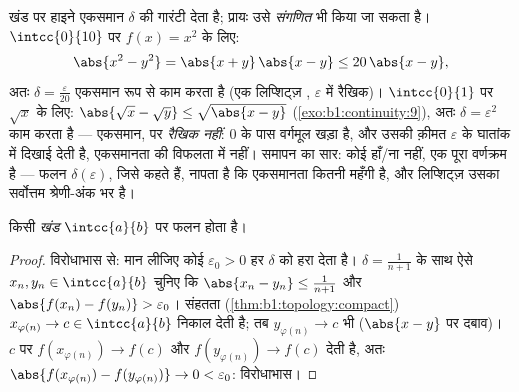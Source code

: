 \begin{example}[एकसमान मापांक, स्पष्ट रूप से]\label{ex:b1:continuity:moduli}
खंड पर हाइने एकसमान $\delta$ की गारंटी देता है; प्रायः उसे \emph{संगणित} भी
किया जा सकता है। $\intcc{0}{10}$ पर $f(x) = x^2$ के लिए:
\[
\abs{x^2 - y^2} = \abs{x + y}\,\abs{x - y} \leq 20\,\abs{x - y},
\]
अतः $\delta = \frac{\varepsilon}{20}$ एकसमान रूप से काम करता है (एक
लिप्शिट्ज़ , $\varepsilon$ में रैखिक)। $\intcc{0}{1}$ पर $\sqrt x$ के
लिए: $\abs{\sqrt x - \sqrt y} \leq \sqrt{\abs{x - y}}$
(\cref{exo:b1:continuity:9}), अतः $\delta = \varepsilon^2$ काम करता है ---
एकसमान, पर \emph{रैखिक नहीं}: $0$ के पास वर्गमूल खड़ा है, और उसकी क़ीमत
$\varepsilon$ के घातांक में दिखाई देती है, एकसमानता की विफलता में नहीं।
समापन का सार:  कोई हाँ/ना नहीं, एक पूरा वर्णक्रम है --- फलन
$\delta(\varepsilon)$, जिसे  कहते हैं, नापता है कि एकसमानता कितनी
महँगी है, और लिप्शिट्ज़ उसका सर्वोत्तम श्रेणी-अंक भर है।
\end{example}

\begin{theorem}[हाइने]\label{thm:b1:continuity:heine}
किसी \emph{खंड} $\intcc{a}{b}$ पर  फलन  होता
है।
\end{theorem}

\begin{proof}
विरोधाभास से: मान लीजिए कोई $\varepsilon_0 > 0$ हर $\delta$ को हरा देता है।
$\delta = \frac{1}{n+1}$ के साथ ऐसे $x_n, y_n \in \intcc{a}{b}$ चुनिए कि
$\abs{x_n - y_n} \leq \frac{1}{n+1}$ और $\abs{f(x_n) - f(y_n)} >
\varepsilon_0$। संहतता (\cref{thm:b1:topology:compact}) $x_{\varphi(n)} \to
c \in \intcc{a}{b}$ निकाल देती है; तब $y_{\varphi(n)} \to c$ भी ($\abs{x -
y}$ पर दबाव)। $c$ पर  $f(x_{\varphi(n)}) \to f(c)$ और
$f(y_{\varphi(n)}) \to f(c)$ देती है, अतः $\abs{f(x_{\varphi(n)}) -
f(y_{\varphi(n)})} \to 0 < \varepsilon_0$: विरोधाभास।
\end{proof}

